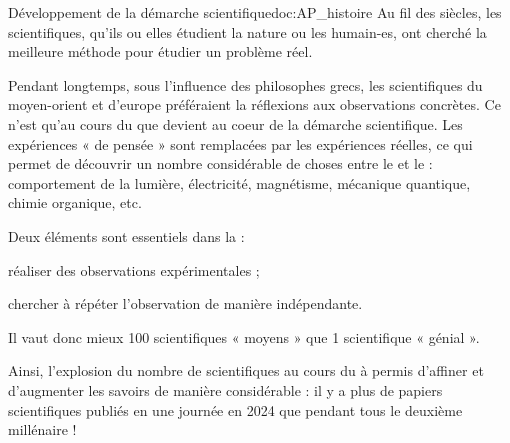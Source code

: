 \begin{doc}{Développement de la démarche scientifique}{doc:AP_histoire}
  Au fil des siècles, les scientifiques, qu'ils ou elles étudient la nature ou les humain-es, ont cherché la meilleure méthode pour étudier un problème réel.

  Pendant longtemps, sous l'influence des philosophes grecs, les scientifiques du moyen-orient et d'europe préféraient la réflexions aux observations concrètes.
  Ce n'est qu'au cours du  que  devient au coeur de la démarche scientifique.
  Les expériences « de pensée » sont remplacées par les expériences réelles, ce qui permet de découvrir un nombre considérable de choses entre le  et le  : comportement de la lumière, électricité, magnétisme, mécanique quantique, chimie organique, etc.
  \bigskip 

  Deux éléments sont essentiels dans la  : 
  \begin{listePoints}
    \item réaliser des observations expérimentales ;
    \item chercher à répéter l'observation de manière indépendante.
  \end{listePoints}
  Il vaut donc mieux 100 scientifiques « moyens » que 1 scientifique « génial ».

  Ainsi, l'explosion du nombre de scientifiques au cours du  à permis d'affiner et d'augmenter les savoirs de manière considérable : il y a plus de papiers scientifiques publiés en une journée en 2024 que pendant tous le deuxième millénaire !
\end{doc}


